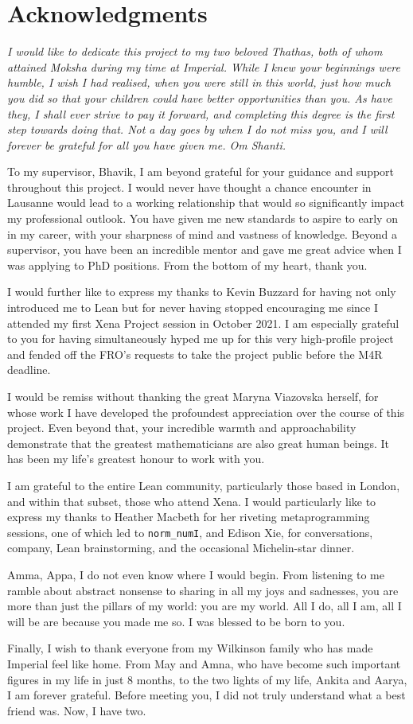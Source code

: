 \thispagestyle{empty}
\section*{Acknowledgments}

\textit{I would like to dedicate this project to my two beloved Thathas, both of whom attained Moksha during my time at Imperial. While I knew your beginnings were humble, I wish I had realised, when you were still in this world, just how much you did so that your children could have better opportunities than you. As have they, I shall ever strive to pay it forward, and completing this degree is the first step towards doing that. Not a day goes by when I do not miss you, and I will forever be grateful for all you have given me. Om Shanti.}

To my supervisor, Bhavik, I am beyond grateful for your guidance and support throughout this project. I would never have thought a chance encounter in Lausanne would lead to a working relationship that would so significantly impact my professional outlook. You have given me new standards to aspire to early on in my career, with your sharpness of mind and vastness of knowledge. Beyond a supervisor, you have been an incredible mentor and gave me great advice when I was applying to PhD positions. From the bottom of my heart, thank you.

I would further like to express my thanks to Kevin Buzzard for having not only introduced me to Lean but for never having stopped encouraging me since I attended my first Xena Project session in October 2021. I am especially grateful to you for having simultaneously hyped me up for this very high-profile project and fended off the FRO's requests to take the project public before the M4R deadline.

I would be remiss without thanking the great Maryna Viazovska herself, for whose work I have developed the profoundest appreciation over the course of this project. Even beyond that, your incredible warmth and approachability demonstrate that the greatest mathematicians are also great human beings. It has been my life's greatest honour to work with you.

I am grateful to the entire Lean community, particularly those based in London, and within that subset, those who attend Xena. I would particularly like to express my thanks to Heather Macbeth for her riveting metaprogramming sessions, one of which led to \lstinline|norm_numI|, and Edison Xie, for conversations, company, Lean brainstorming, and the occasional Michelin-star dinner.

Amma, Appa, I do not even know where I would begin. From listening to me ramble about abstract nonsense to sharing in all my joys and sadnesses, you are more than just the pillars of my world: you are my world. All I do, all I am, all I will be are because you made me so. I was blessed to be born to you.

Finally, I wish to thank everyone from my Wilkinson family who has made Imperial feel like home. From May and Amna, who have become such important figures in my life in just 8 months, to the two lights of my life, Ankita and Aarya, I am forever grateful. Before meeting you, I did not truly understand what a best friend was. Now, I have two.